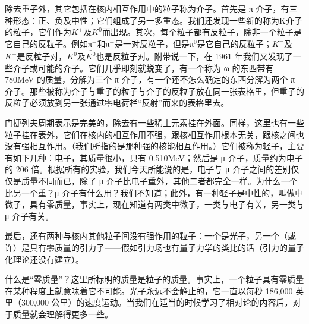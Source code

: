 \documentclass[11pt,oneside]{book}
\begin{document}
\begin{common-format}
除去重子外，其它包括在核内相互作用中的粒子称为介子。首先是 π 介子，有三种形态：正、负及中性；它们组成了另一多重态。我们还发现一些新的称为K介子的粒子，它们作为$ K^{+} $及$ { K }^{ 0 } $而出现。其次，每个粒子都有反粒子，除非一个粒子是它自己的反粒子。例如π$^{-} $和π$^{+} $是一对反粒子，但是π$^0 $是它自己的反粒子；$K^- $及$ K^+ $是反粒子对，$ { K }^{ 0 } $及$ \bar {{ K }^{ 0 } }  $也是反粒子对。附带说一下，在 1961 年我们又发现了一些介子或可能的介子。它们几乎即刻就蜕变了，有一个称为 ω 的东西带有 780MeV 的质量，分解为三个 π 介子，有一个还不怎么确定的东西分解为两个 π 介子。那些被称为介子与重子的粒子与介子的反粒子放在同一张表格里，但重子的反粒子必须放到另一张通过零电荷栏“反射”而来的表格里去。

门捷列夫周期表示是完美的，除去有一些稀土元素挂在外面。同样，这里也有一些粒子挂在表外，它们在核内的相互作用不强，跟核相互作用根本无关，跟核之间也没有强相互作用。（我们所指的是那种强的核能相互作用。）它们被称为轻子，主要有如下几种：电子，其质量很小，只有 0.510MeV；然后是 μ 介子，质量约为电子的 206 倍。根据所有的实验，我们今天所能说的是，电子与 μ 介子之间的差别仅仅是质量不同而已，除了 μ 介子比电子重外，其他二者都完全一样。为什么一个比另一个重？μ 介子有什么用？我们不知道；此外，有一种轻子是中性的，叫做中微子，具有零质量，事实上，现在知道有两类中微子，一类与电子有关，另一类与 μ 介子有关。

最后，还有两种与核内其他粒子间没有强作用的粒子：一个是光子，另一个（或许）是具有零质量的引力子——假如引力场也有量子力学的类比的话（引力的量子化理论还没有建立）。

什么是“零质量”？这里所标明的质量是粒子的质量。事实上，一个粒子具有零质量在某种程度上就意味着它不可能。光子永远不会静止的，它一直以每秒 186,000 英里（300,000 公里）的速度运动。当我们在适当的时候学习了相对论的内容后，对于质量就会理解得更多一些。


\end{common-format}
\end{document}
